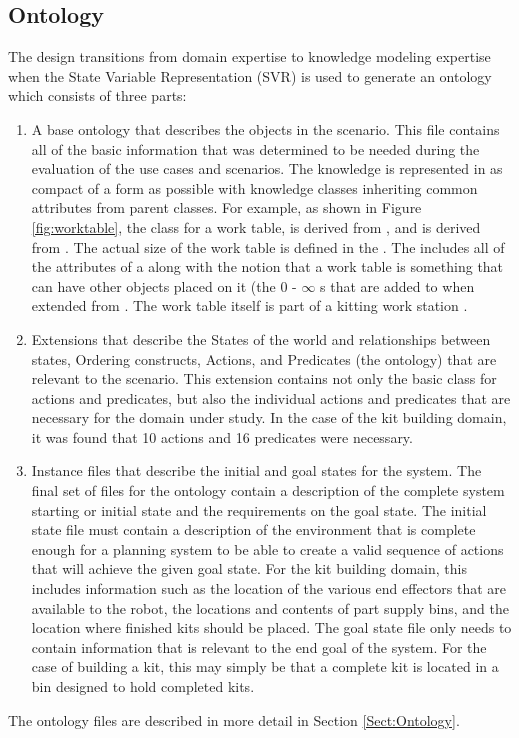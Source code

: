 \subsection{Ontology}
The design transitions from domain expertise to knowledge modeling expertise
when the State Variable Representation (SVR) is used to generate an ontology which consists of three parts:
\begin{enumerate}
 \item A base ontology that describes the objects in the scenario. This file contains
all of the basic information that was determined to be needed during the evaluation of
the use cases and scenarios. The knowledge is represented in as compact of a form as
possible with knowledge classes inheriting common attributes from parent classes.
For example, as shown in Figure \ref{fig:worktable}, the class for a work table,  is derived from
, and  is derived from . The actual size of the work table
is defined in the . The  includes all of the attributes
of a  along with the notion that a work table is something that can have
other objects placed on it (the 0 - $\infty$ s that are added to 
when extended from . The work table itself is part of a 
kitting work station .
 \item Extensions that describe the States of the world and relationships between states,
Ordering constructs, Actions, and Predicates (the  ontology)
that are relevant to the scenario. This extension contains not only the basic class for
actions and predicates, but also the individual actions and predicates that are necessary
for the domain under study. In the case of the kit building domain, it was found that
10 actions and 16 predicates were necessary.
 \item Instance files that describe the initial and goal states for the system. The final set
of files for the ontology contain a description of the complete system starting or initial state and the
requirements on the goal state. The initial state file must contain a description of the environment that
is complete enough for a planning system to be able to create a valid sequence of actions that will achieve
the given goal state. For the kit building domain, this includes information such as the location of the
various end effectors that are available to the robot, the locations and contents of part supply bins, and
the location where finished kits should be placed. The goal state file only needs to contain information that
is relevant to the end goal of the system. For the case of building a kit, this may simply be that a complete
kit is located in a bin designed to hold completed kits.
\end{enumerate}
The ontology files are
described in more detail in Section \ref{Sect:Ontology}.

